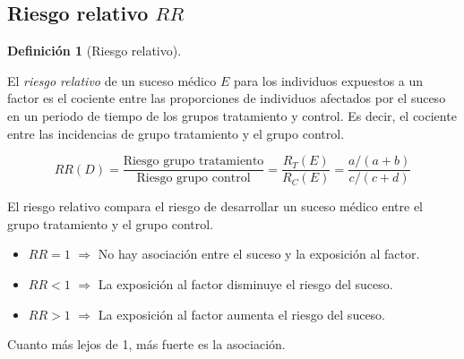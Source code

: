 \documentclass[
  spanish,
  a4paper,
]{scrreport}
\providecommand{\tightlist}{%
  \setlength{\itemsep}{0pt}\setlength{\parskip}{0pt}}
\theoremstyle{plain}
\theoremstyle{definition}
\theoremstyle{definition}
\newtheorem{definition}{Definición}[chapter]
\theoremstyle{remark}
\begin{document}
\subsection{\texorpdfstring{Riesgo relativo
\(RR\)}{Riesgo relativo RR}}\label{riesgo-relativo-rr}

\begin{definition}[Riesgo
relativo]\protect\hypertarget{def-riesgo-relativo}{}\label{def-riesgo-relativo}

El \emph{riesgo relativo} de un suceso médico \(E\) para los individuos
expuestos a un factor es el cociente entre las proporciones de
individuos afectados por el suceso en un periodo de tiempo de los grupos
tratamiento y control. Es decir, el cociente entre las incidencias de
grupo tratamiento y el grupo control.

\[RR(D)=\frac{\mbox{Riesgo grupo tratamiento}}{\mbox{Riesgo grupo control}}=\frac{R_T(E)}{R_C(E)}=\frac{a/(a+b)}{c/(c+d)}\]

\end{definition}

\begin{tcolorbox}[enhanced jigsaw, arc=.35mm, bottomrule=.15mm, bottomtitle=1mm, breakable, colback=white, colbacktitle=quarto-callout-note-color!10!white, colframe=quarto-callout-note-color-frame, coltitle=black, left=2mm, leftrule=.75mm, opacityback=0, opacitybacktitle=0.6, rightrule=.15mm, title=\textcolor{quarto-callout-note-color}{\faInfo}\hspace{0.5em}{Interpretación}, titlerule=0mm, toprule=.15mm, toptitle=1mm]

El riesgo relativo compara el riesgo de desarrollar un suceso médico
entre el grupo tratamiento y el grupo control.

\begin{itemize}
\tightlist
\item
  \(RR=1\) \(\Rightarrow\) No hay asociación entre el suceso y la
  exposición al factor.
\item
  \(RR<1\) \(\Rightarrow\) La exposición al factor disminuye el riesgo
  del suceso.
\item
  \(RR>1\) \(\Rightarrow\) La exposición al factor aumenta el riesgo del
  suceso.
\end{itemize}

Cuanto más lejos de 1, más fuerte es la asociación.

\end{tcolorbox}
\end{document}

